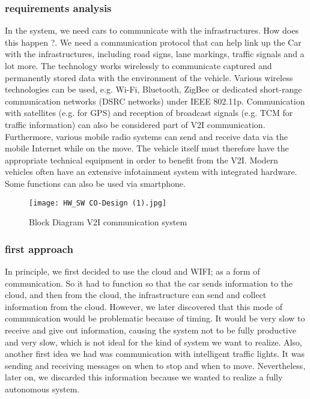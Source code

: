 \documentclass[conference]{IEEEtran}
\begin{document}
\subsubsection{requirements analysis }
In the system, we need cars to communicate with the infrastructures. How does this happen ?. We need a communication protocol that can help link up the Car with the infrastructures, including road signs, lane markings, traffic signals and a lot more. The technology works wirelessly to communicate captured and permanently stored data with the environment of the vehicle. Various wireless technologies can be used, e.g. Wi-Fi, Bluetooth, ZigBee or dedicated short-range communication networks (DSRC networks) under IEEE 802.11p. Communication with satellites (e.g. for GPS) and reception of broadcast signals (e.g. TCM for traffic information) can also be considered part of V2I communication.
Furthermore, various mobile radio systems can send and receive data via the mobile Internet while on the move. The vehicle itself must therefore have the appropriate technical equipment in order to benefit from the V2I. Modern vehicles often have an extensive infotainment system with integrated hardware. Some functions can also be used via smartphone.

\begin{figure}[htp]
    \centering
    \texttt{[image: HW\_SW CO-Design (1).jpg]}
    \caption{Block Diagram V2I communication system}
    \label{fig:reg-gen}
\end{figure}

\subsubsection{first approach }
In principle, we first decided to use the cloud and WIFI; as a form of communication. So it had to function so that the car sends information to the cloud, and then from the cloud, the infrastructure can send and collect information from the cloud. However, we later discovered that this mode of communication would be problematic because of timing. It would be very slow to receive and give out information, causing the system not to be fully productive and very slow, which is not ideal for the kind of system we want to realize. Also, another first idea we had was communication with intelligent traffic lights. It was sending and receiving messages on when to stop and when to move. Nevertheless, later on, we discarded this information because we wanted to realize a fully autonomous system.
\end{document}
